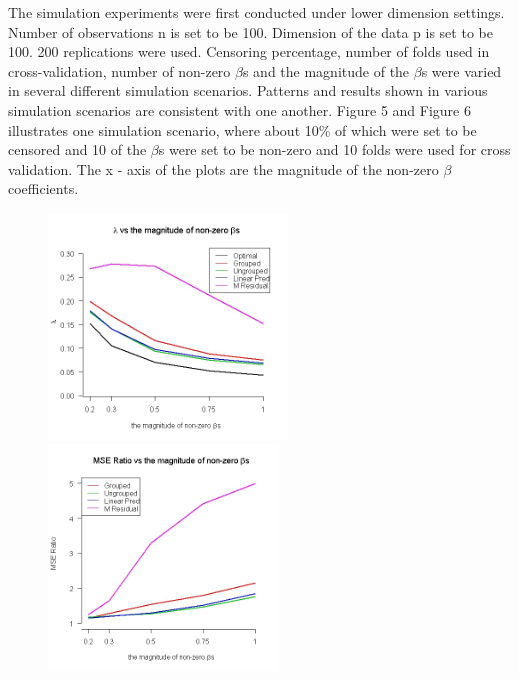 \documentclass{article}\usepackage[]{graphicx}\usepackage[]{color}
\begin{document}
   The simulation experiments were first conducted under lower dimension settings. Number of observations n is set to be 100. Dimension of the data p is set to be 100. 200 replications were used. Censoring percentage, number of folds used in cross-validation, number of non-zero $\beta$s and the magnitude of the $\beta$s were varied in several different simulation scenarios. Patterns and results shown in various simulation scenarios are consistent with one another. Figure 5 and Figure 6 illustrates one simulation scenario, where about 10$\%$ of which were set to be censored and 10 of the $\beta$s were set to be non-zero and 10 folds were used for cross validation. The x - axis of the plots are the magnitude of the non-zero $\beta$ coefficients. 
   
   \begin{figure}[h]
   \centering
    \begin{minipage}[b]{0.4\textwidth}
      \centering
		  \includegraphics[height= 6cm ]{./figures/05.jpeg}
      \caption{ }
     \end{minipage}
     \begin{minipage}[b]{0.4\textwidth}
      \centering
		  \includegraphics[height= 6cm ]{./figures/06.jpeg}
      \caption{ }
      \end{minipage}	
   \end{figure}	
   
\end{document}
